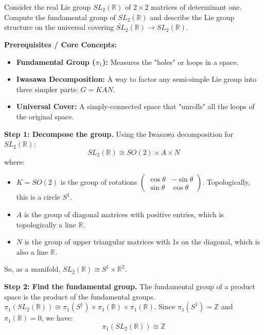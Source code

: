 \begin{exercise}
\label{algebra:2012:10}
Consider the real Lie group $SL_2(\mathbb{R})$ of $2 \times 2$ matrices of determinant one. Compute the fundamental group of $SL_2(\mathbb{R})$ and describe the Lie group structure on the universal covering $\widetilde{SL}_2(\mathbb{R}) \to SL_2(\mathbb{R})$.
\end{exercise}

\begin{solution}
\textbf{Prerequisites / Core Concepts:}
\begin{itemize}
    \item \textbf{Fundamental Group ($\pi_1$):} Measures the "holes" or loops in a space.
    \item \textbf{Iwasawa Decomposition:} A way to factor any semi-simple Lie group into three simpler parts: $G = KAN$.
    \item \textbf{Universal Cover:} A simply-connected space that "unrolls" all the loops of the original space.
\end{itemize}

\textbf{Step 1: Decompose the group.}
Using the Iwasawa decomposition for $SL_2(\mathbb{R})$:
\[ SL_2(\mathbb{R}) \cong SO(2) \times A \times N \]
where:
\begin{itemize}
    \item $K = SO(2)$ is the group of rotations $\begin{pmatrix} \cos \theta & -\sin \theta \\ \sin \theta & \cos \theta \end{pmatrix}$. Topologically, this is a circle $S^1$.
    \item $A$ is the group of diagonal matrices with positive entries, which is topologically a line $\mathbb{R}$.
    \item $N$ is the group of upper triangular matrices with 1s on the diagonal, which is also a line $\mathbb{R}$.
\end{itemize}
So, as a manifold, $SL_2(\mathbb{R}) \cong S^1 \times \mathbb{R}^2$.

\textbf{Step 2: Find the fundamental group.}
The fundamental group of a product space is the product of the fundamental groups.
$\pi_1(SL_2(\mathbb{R})) \cong \pi_1(S^1) \times \pi_1(\mathbb{R}) \times \pi_1(\mathbb{R})$.
Since $\pi_1(S^1) = \mathbb{Z}$ and $\pi_1(\mathbb{R}) = 0$, we have:
\[ \pi_1(SL_2(\mathbb{R})) \cong \mathbb{Z} \]


\end{solution}
